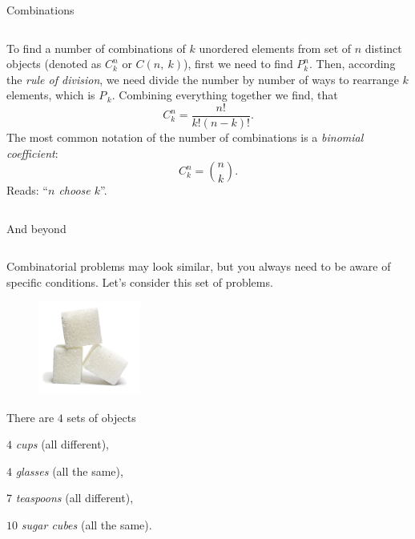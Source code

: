 \documentclass[9pt,aspectratio=169]{beamer}
\begin{document}
\begin{frame}{Combinations}
\begin{columns}[T]
\begin{column}{0.5\textwidth}
      To find a number of combinations of $k$ unordered elements from set of $n$ distinct objects (denoted as $C_k^n$ or $C(n,\ k)$), first we need to find $P_k^n$. Then, according the \emph{rule of division}, we need divide the number by number of ways to rearrange $k$ elements, which is $P_{\,k}$. Combining everything together we find, that
      \[
        C_k^n = \frac{n!}{k! (n-k)!}.
      \]
      The most common notation of the number of combinations is a \emph{binomial coefficient}:
      \[
        C_k^n = \binom{n}{k}.
      \]
      Reads: “\emph{$n$ choose $k$}”.

    \end{column}
  \end{columns}
\end{frame}

\begin{frame}{And beyond}
  \begin{columns}[T]
    \begin{column}{0.5\textwidth}
      Combinatorial problems may look similar, but you always need to be aware of specific conditions. Let's consider this set of problems.

      \begin{problem}%
        \begin{figure}%
          \vspace{-2em}
          \includegraphics[width=0.3\textwidth]{02 - Combinatorics 101/sugar.png}
        \end{figure}

        There are $4$ sets of objects

        \quad $4$ \emph{cups} (all different),

        \quad $4$ \emph{glasses} (all the same),

        \quad $7$ \emph{teaspoons} (all different),

        \quad $10$ \emph{sugar cubes} (all the same).


\end{problem}
\end{column}
\end{columns}
\end{frame}
\end{document}
